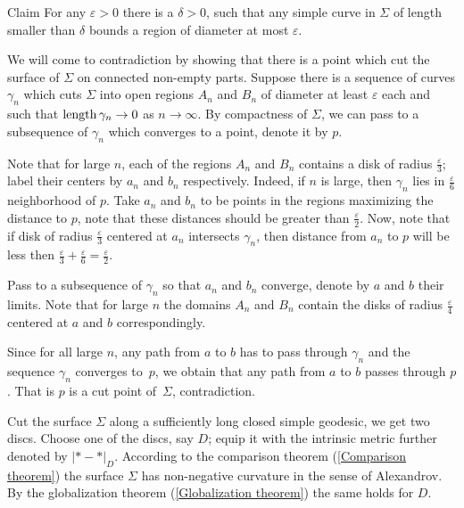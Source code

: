 \documentclass[oneside,a4paper, 12pt]{article}
\begin{document}
\begin{thm}{Claim}\label{Lemma:diameter-perimeter}
For any $\varepsilon>0$ there is a $\delta>0$, such that any simple curve in $\Sigma$ of length smaller than $\delta$ bounds a region of diameter at most $\varepsilon$.
\end{thm}

We will come to contradiction by showing that there is a point which cut the surface of $\Sigma$ on connected non-empty parts.
Suppose there is a sequence of curves $\gamma_n$ which cuts $\Sigma$ into open regions $A_n$ and $B_n$ of diameter at least $\varepsilon$ each and such that $\mathop{\rm length}\nolimits\gamma_n\to 0$ as $n\to\infty$. 
By compactness of $\Sigma$,
we can pass to a subsequence of $\gamma_n$ which converges to a point, denote it by $p$.

Note that for large $n$, each of the regions $A_n$ and $B_n$ contains a disk of radius $\tfrac{\varepsilon}{3}$;
label their centers by $a_n$ and $b_n$ respectively. 
Indeed, if $n$ is large, then $\gamma_n$ lies in $\tfrac{\varepsilon}{6}$ neighborhood of $p$.
Take $a_n$ and $b_n$ to be points in the regions maximizing the distance to $p$, note that these distances should be greater than $\tfrac{\varepsilon}{2}$.
Now, note that if disk of radius $\tfrac{\varepsilon}{3}$ centered at $a_n$ intersects $\gamma_n$, then distance from $a_n$ to $p$ will be less then $\tfrac{\varepsilon}{3}+\tfrac{\varepsilon}{6}=\tfrac{\varepsilon}{2}$.

Pass to a subsequence of $\gamma_n$ so that $a_n$ and $b_n$ converge, denote by $a$ and $b$ their limits.
Note that for large $n$ the domains $A_n$ and $B_n$ contain the disks of radius $\tfrac\varepsilon4$ centered at $a$ and $b$ correspondingly.

Since for all large $n$, any path from $a$ to $b$ has to pass through $\gamma_n$ and the sequence $\gamma_n$ converges to~$p$, we obtain that any path from $a$ to $b$ passes through $p$.
That is $p$ is a cut point of~$\Sigma$, contradiction.
\qeds


Cut the surface $\Sigma$ along a sufficiently long closed simple geodesic,
we get two discs.
Choose one of the discs, say $D$;
equip it with the intrinsic metric further denoted by $|{*}-{*}|_D$.
According to the comparison theorem (\ref{Comparison theorem}) the surface $\Sigma$ has non-negative curvature in the sense of Alexandrov.
By the globalization theorem (\ref{Globalization theorem}) the same holds for $D$.
\end{document}
